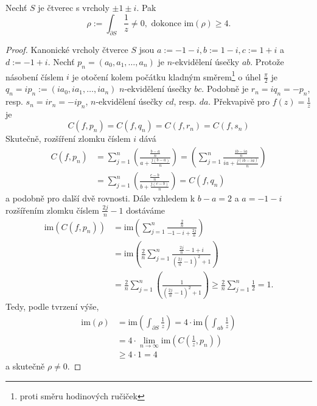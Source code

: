 \documentclass[../main.tex]{subfiles}
\begin{document}
\begin{theorem}
    Nechť $S$ je čtverec s vrcholy $\pm 1 \pm i$. Pak
    \[ \rho := \int_{\partial S}\frac{1}{z} \neq 0, \,\, \text{dokonce}\,\, \text{im}(\rho) \geq 4. \]
\end{theorem}
\begin{proof}
    Kanonické vrcholy čtverce $S$ jsou $a:= -1-i,b:=1-i,c:=1+i$ a $d:=-1+i$.
    Nechť $p_n = (a_0,a_1,\dots,a_n)$ je $n$-ekvidělení úsečky $ab$.
    Protože násobení číslem $i$ je otočení kolem počátku kladným směrem\footnote{proti směru hodinových ručiček}
    o úhel $\frac{\pi}{2}$ je $q_n = ip_n := (ia_0,ia_1,\dots,ia_n)$ $n$-ekvidělení úsečky $bc$.
    Podobně je $r_n = iq_n = -p_n$, resp. $s_n = ir_n = -ip_n$, $n$-ekvidělení úsečky $cd$, resp. $da$.
    Překvapivě pro $f(z) = \frac{1}{z}$ je
    \[ C(f,p_n) = C(f,q_n) = C(f,r_n) = C(f,s_n) \]
    Skutečně, rozšíření zlomku číslem $i$ dává
    \begin{align*}
        C(f,p_n) &= \sum_{j=1}^{n}\left( \frac{\frac{b-a}{n}}{a+ \frac{j(b-a)}{n}} \right) = \left( \sum_{j=1}^{n} \frac{\frac{ib-ia}{n}}{ia+ \frac{j(ib-ia)}{n}}\right)\\
        &= \sum_{j=1}^{n}\left( \frac{\frac{c-b}{n}}{b+ \frac{j(c-b)}{n}}\right) = C(f,q_n)
    \end{align*}
    a podobně pro další dvě rovnosti. Dále vzhledem k $b-a = 2$ a $a = -1-i$ rozšířením zlomku číslem $\frac{2j}{n} - 1$ dostáváme
    \begin{align*}
        \text{im}(C(f,p_n)) &= \text{im}\left( \sum_{j=1}^{n}\frac{\frac{2}{n}}{-1-i+\frac{2j}{n}} \right)\\
        &= \text{im}\left(\frac{2}{n} \sum_{j=1}^{n}\frac{\frac{2j}{n} - 1 + i}{\left(\frac{2j}{n} - 1\right)^2 + 1}\right)\\
        &= \frac{2}{n}\sum_{j=1}^{n}\left(\frac{1}{\left(\frac{2j}{n} - 1\right)^2 + 1}\right) \geq \frac{2}{n}\sum_{j=1}^{n}\frac{1}{2} = 1.
    \end{align*}
    Tedy, podle tvrzení výše,
    \begin{align*}
        \text{im}(\rho) &= \text{im}\left(\int_{\partial S}\frac{1}{z}\right) = 4 \cdot \text{im}\left(\int_{ab}\frac{1}{z}\right)\\
        &= 4 \cdot \lim_{n\to\infty}\text{im}\left(C\left( \frac{1}{z},p_n \right)\right)\\
        &\geq 4\cdot 1 = 4
    \end{align*}
    a skutečně $\rho \neq 0$.
\end{proof}
\end{document}
